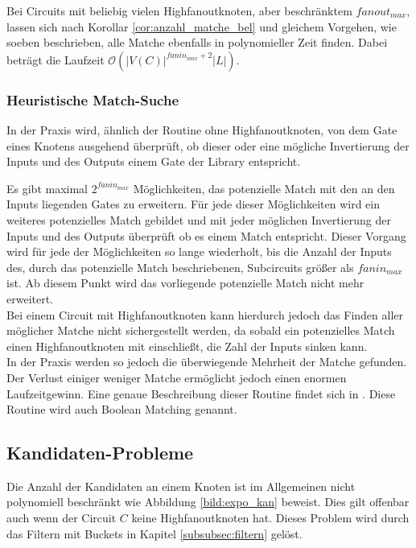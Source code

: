 \documentclass[11pt, a4paper, german]{article}
\begin{document}
Bei Circuits mit beliebig vielen Highfanoutknoten, aber beschränktem $fanout_{max}$, lassen sich nach Korollar \ref{cor:anzahl_matche_bel} und gleichem Vorgehen, wie soeben beschrieben, alle Matche ebenfalls in polynomieller Zeit finden. Dabei beträgt die Laufzeit $\mathcal{O}(|V(C)|^{fanin_{max}+2}|L|)$.

\subsubsection{Heuristische Match-Suche}
In der Praxis wird, ähnlich der Routine ohne Highfanoutknoten, von dem Gate eines Knotens ausgehend überprüft, ob dieser oder eine mögliche Invertierung der Inputs und des Outputs einem Gate der Library entspricht. 

Es gibt maximal $2^{fanin_{max}}$ Möglichkeiten, das potenzielle Match mit den an den Inputs liegenden Gates zu erweitern. Für jede dieser Möglichkeiten wird ein weiteres potenzielles Match gebildet und mit jeder möglichen Invertierung der Inputs und des Outputs überprüft ob es einem Match entspricht.
Dieser Vorgang wird für jede der Möglichkeiten so lange wiederholt, bis die Anzahl der Inputs des, durch das potenzielle Match beschriebenen, Subcircuits größer als $fanin_{max}$ ist. Ab diesem Punkt wird das vorliegende potenzielle Match nicht mehr erweitert. \\
Bei einem Circuit mit Highfanoutknoten kann hierdurch jedoch das Finden aller möglicher Matche nicht sichergestellt werden, da sobald ein potenzielles Match einen Highfanoutknoten mit einschließt, die Zahl der Inputs sinken kann. \\
In der Praxis werden so jedoch die überwiegende Mehrheit der Matche gefunden. Der Verlust einiger weniger Matche ermöglicht jedoch einen enormen Laufzeitgewinn.
Eine genaue Beschreibung dieser Routine findet sich in \cite{BooleanMatching}. Diese Routine wird auch Boolean Matching genannt.

\subsection{Kandidaten-Probleme}
\label{subsec:kand_prob}
Die Anzahl der Kandidaten an einem Knoten ist im Allgemeinen nicht polynomiell beschränkt wie Abbildung \ref{bild:expo_kan} beweist. Dies gilt offenbar auch wenn der Circuit $C$ keine Highfanoutknoten hat. Dieses Problem wird durch das Filtern mit Buckets in Kapitel \ref{subsubsec:filtern} gelöst.
\end{document}
